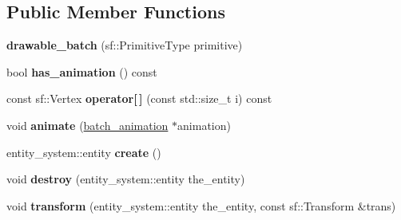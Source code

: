 \subsection*{Public Member Functions}
\begin{DoxyCompactItemize}
\item 
\hypertarget{classophidian_1_1gui_1_1drawable__batch_ab292a39098427459b3b8716d0e253b6b}{{\bfseries drawable\-\_\-batch} (sf\-::\-Primitive\-Type primitive)}\label{classophidian_1_1gui_1_1drawable__batch_ab292a39098427459b3b8716d0e253b6b}

\item 
\hypertarget{classophidian_1_1gui_1_1drawable__batch_aace1996142140600b5d32dc279895bc7}{bool {\bfseries has\-\_\-animation} () const }\label{classophidian_1_1gui_1_1drawable__batch_aace1996142140600b5d32dc279895bc7}

\item 
\hypertarget{classophidian_1_1gui_1_1drawable__batch_aac2836f92ce7577ff5c4925da892953f}{const sf\-::\-Vertex {\bfseries operator\mbox{[}$\,$\mbox{]}} (const std\-::size\-\_\-t i) const }\label{classophidian_1_1gui_1_1drawable__batch_aac2836f92ce7577ff5c4925da892953f}

\item 
\hypertarget{classophidian_1_1gui_1_1drawable__batch_afc9e4aeeaae5156e0b9e800532427913}{void {\bfseries animate} (\hyperlink{classophidian_1_1gui_1_1batch__animation}{batch\-\_\-animation} $\ast$animation)}\label{classophidian_1_1gui_1_1drawable__batch_afc9e4aeeaae5156e0b9e800532427913}

\item 
\hypertarget{classophidian_1_1gui_1_1drawable__batch_a652e9e8d19ec1eb9c9257658d6330a47}{entity\-\_\-system\-::entity {\bfseries create} ()}\label{classophidian_1_1gui_1_1drawable__batch_a652e9e8d19ec1eb9c9257658d6330a47}

\item 
\hypertarget{classophidian_1_1gui_1_1drawable__batch_acc66068b88bcfe461257981fd251eaf7}{void {\bfseries destroy} (entity\-\_\-system\-::entity the\-\_\-entity)}\label{classophidian_1_1gui_1_1drawable__batch_acc66068b88bcfe461257981fd251eaf7}

\item 
\hypertarget{classophidian_1_1gui_1_1drawable__batch_ae0eba02d62a170a6bbfd4a486ba0a407}{void {\bfseries transform} (entity\-\_\-system\-::entity the\-\_\-entity, const sf\-::\-Transform \&trans)}\label{classophidian_1_1gui_1_1drawable__batch_ae0eba02d62a170a6bbfd4a486ba0a407}


\end{DoxyCompactItemize}
